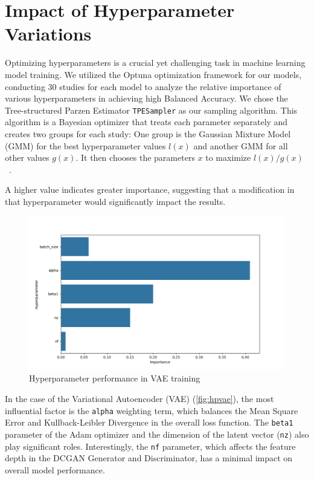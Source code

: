 \section{Impact of Hyperparameter Variations}
Optimizing hyperparameters is a crucial yet challenging task in machine learning model training. We utilized the Optuna optimization framework for our models, conducting 30 studies for each model to analyze the relative importance of various hyperparameters in achieving high Balanced Accuracy. We chose the Tree-structured Parzen Estimator \lstinline{TPESampler} as our sampling algorithm. This algorithm is a Bayesian optimizer that treats each parameter separately and creates two groups for each study: One group is the Gaussian Mixture Model (GMM) for the best hyperparameter values $l(x)$ and another GMM for all other values $g(x)$. It then chooses the parameters $x$ to maximize $l(x)/g(x)$~\cite{optuna2014doc}.

A higher value indicates greater importance, suggesting that a modification in that hyperparameter would significantly impact the results.

\begin{figure}[h!]
    \includegraphics[width=\linewidth]{images/importances_vae}
    \caption{
    Hyperparameter performance in VAE training
}
\label{fig:hpvae}
\end{figure}

In the case of the Variational Autoencoder (VAE) (\autoref{fig:hpvae}), the most influential factor is the \lstinline{alpha} weighting term, which balances the Mean Square Error and Kullback-Leibler Divergence in the overall loss function. The \lstinline{beta1} parameter of the Adam optimizer and the dimension of the latent vector (\lstinline{nz}) also play significant roles. Interestingly, the \lstinline{nf} parameter, which affects the feature depth in the DCGAN Generator and Discriminator, has a minimal impact on overall model performance.

